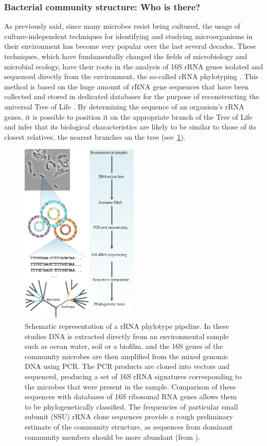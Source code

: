 \subsubsection{Bacterial community structure: Who is there? \label{par:whois}}
As previously said, since many microbes resist being cultured, the usage of culture-independent techniques for identifying and studying microorganisms in their environment has become very popular over the last several decades. These techniques, which have fundamentally changed the fields of microbiology and microbial ecology, have their roots in the analysis of 16S rRNA genes isolated and sequenced directly from the environment, the so-called rRNA phylotyping \cite{pace1997molecular, olsen1986microbial}. This method is based on the huge amount of rRNA gene sequences that have been collected and stored in dedicated databases for the purpose of reconstructing the universal Tree of Life \cite{brown2002universal}. By determining the sequence of an organism’s rRNA genes, it is possible to position it on the appropriate branch of the Tree of Life and infer that its biological characteristics are likely to be similar to those of its closest relatives, the nearest branches on the tree (see~\ref{fig:rnaphylo}).\\
\begin{figure}[!tb]
	\centering
	\includegraphics[width=0.5\textwidth]{./figures/Introduction/rna_phylotyping}
  	\caption{Schematic representation of a rRNA phylotype pipeline. In these studies DNA is extracted directly from an environmental sample such as ocean water, soil or a biofilm, and the 16S genes of the community microbes are then amplified from the mixed genomic DNA using PCR. The PCR products are cloned into vectors and sequenced, producing a set of 16S rRNA signatures corresponding to the microbes that were present in the sample. Comparison of these sequences with databases of 16S ribosomal RNA genes allows them to be phylogenetically classified. The frequencies of particular small subunit (SSU) rRNA clone sequences provide a rough preliminary estimate of the community structure, as sequences from dominant community members should be more abundant (from \cite{tringe2005metagenomics}).\label{fig:rnaphylo}}
\end{figure}
